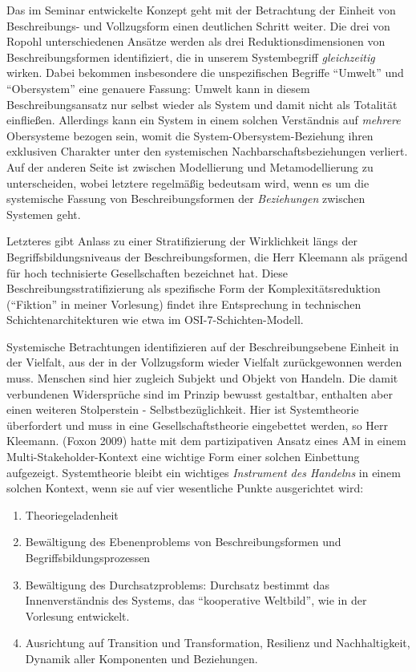 \documentclass[11pt,a4paper]{article}
\begin{document}
Das im Seminar entwickelte Konzept geht mit der Betrachtung der Einheit
von Beschreibungs- und Vollzugsform einen deutlichen Schritt weiter. Die
drei von Ropohl unterschiedenen Ansätze werden als drei
Reduktionsdimensionen von Beschreibungsformen identifiziert, die in
unserem Systembegriff \emph{gleichzeitig} wirken. Dabei bekommen
insbesondere die unspezifischen Begriffe ``Umwelt'' und ``Obersystem''
eine genauere Fassung: Umwelt kann in diesem Beschreibungsansatz nur
selbst wieder als System und damit nicht als Totalität einfließen.
Allerdings kann ein System in einem solchen Verständnis auf
\emph{mehrere} Obersysteme bezogen sein, womit die
System-Obersystem-Beziehung ihren exklusiven Charakter unter den
systemischen Nachbarschaftsbeziehungen verliert. Auf der anderen Seite
ist zwischen Modellierung und Metamodellierung zu unterscheiden, wobei
letztere regelmäßig bedeutsam wird, wenn es um die systemische Fassung
von Beschreibungsformen der \emph{Beziehungen} zwischen Systemen geht.

Letzteres gibt Anlass zu einer Stratifizierung der Wirklichkeit längs
der Begriffsbildungsniveaus der Beschreibungsformen, die Herr Kleemann
als prägend für hoch technisierte Gesellschaften bezeichnet hat. Diese
Beschreibungsstratifizierung als spezifische Form der
Komplexitätsreduktion (``Fiktion'' in meiner Vorlesung) findet ihre
Entsprechung in technischen Schichtenarchitekturen wie etwa im
OSI-7-Schichten-Modell.

Systemische Betrachtungen identifizieren auf der Beschreibungsebene
Einheit in der Vielfalt, aus der in der Vollzugsform wieder Vielfalt
zurückgewonnen werden muss. Menschen sind hier zugleich Subjekt und
Objekt von Handeln. Die damit verbundenen Widersprüche sind im Prinzip
bewusst gestaltbar, enthalten aber einen weiteren Stolperstein -
Selbstbezüglichkeit. Hier ist Systemtheorie überfordert und muss in eine
Gesellschaftstheorie eingebettet werden, so Herr Kleemann. (Foxon 2009)
hatte mit dem partizipativen Ansatz eines AM in einem
Multi-Stakeholder-Kontext eine wichtige Form einer solchen Einbettung
aufgezeigt. Systemtheorie bleibt ein wichtiges \emph{Instrument des
Handelns} in einem solchen Kontext, wenn sie auf vier wesentliche Punkte
ausgerichtet wird:

\begin{enumerate}
[noitemsep]
\item
  Theoriegeladenheit
\item
  Bewältigung des Ebenenproblems von Beschreibungsformen und
  Begriffsbildungsprozessen
\item
  Bewältigung des Durchsatzproblems: Durchsatz bestimmt das
  Innenverständnis des Systems, das ``kooperative Weltbild'', wie in der
  Vorlesung entwickelt.
\item
  Ausrichtung auf Transition und Transformation, Resilienz und
  Nachhaltigkeit, Dynamik aller Komponenten und Beziehungen.
\end{enumerate}
\end{document}
